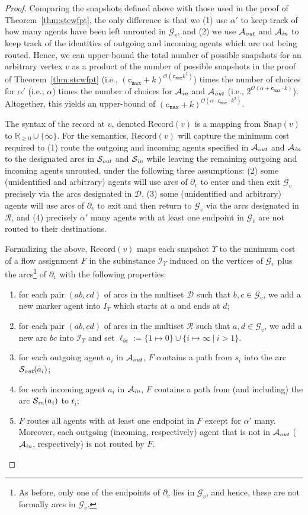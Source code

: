 \documentclass[letterpaper]{article} %
\newcommand{\bigoh}{\ensuremath{{\mathcal O}}}
\newcommand{\cmax}{\mathtt{c_{max}}}
\newcommand{\forgottenG}{\mathcal{G}}
\newcommand{\Rec}{\text{Record}}
\renewcommand{\R}{\mathcal{R}}
\renewcommand{\D}{\mathcal{D}}
\newcommand{\Sout}{\mathcal{S}_\emph{out}}
\newcommand{\Sin}{\mathcal{S}_\emph{in}}
\newcommand{\Aout}{\mathcal{A}_\emph{out}}
\newcommand{\Ain}{\mathcal{A}_\emph{in}}
\newcommand{\snap}{\text{Snap}}
\begin{document}
\begin{proof}
Comparing the snapshots defined above with those used in the proof of Theorem~\ref{thm:stcwfpt}, the only difference is that we (1) use $\alpha'$ to keep track of how many agents have been left unrouted in $\forgottenG_v$, and (2) we use $\Aout$ and $\Ain$ to keep track of the identities of outgoing and incoming agents which are not being routed. Hence, we can upper-bound the total number of possible snapshots for an arbitrary vertex $v$ as a product of the number of possible snapshots in the proof of Theorem~\ref{thm:stcwfpt} (i.e., $(\cmax+k)^{\bigoh(\cmax k^2)}$) times the number of choices for $\alpha'$ (i.e., $\alpha$) times the number of choices for $\Ain$ and $\Aout$ (i.e., $2^{\bigoh(\alpha+\cmax\cdot k)}$). Altogether, this yields an upper-bound of $(\cmax+k)^{\bigoh(\alpha \cdot \cmax \cdot k^2)}$.

The syntax of the record at $v$, denoted $\Rec(v)$ is a mapping from $\snap(v)$ to $\mathbb{R}_{\geq 0}\cup \{\infty\}$. For the semantics, $\Rec(v)$ will capture the minimum cost required to (1) route the outgoing and incoming agents specified in $\Aout$ and $\Ain$ to the designated arcs in $\Sout$ and $\Sin$ while leaving the remaining outgoing and incoming agents unrouted, under the following three assumptions: (2) some (unidentified and arbitrary) agents will use arcs of $\partial_v$ to enter and then exit $\forgottenG_v$ precisely via the arcs designated in $\D$, (3) some (unidentified and arbitrary) agents will use arcs of $\partial_v$ to exit and then return to $\forgottenG_v$ via the arcs designated in $\R$, and (4) precisely $\alpha'$ many agents with at least one endpoint in $\forgottenG_v$ are not routed to their destinations.

Formalizing the above, $\Rec(v)$ maps each snapshot $\Upsilon$ to the minimum cost of a flow assignment $F$ in the subinstance $\mathcal{I}_\Upsilon$ induced on the vertices of $\forgottenG_v$ plus the arcs\footnote{As before, only one of the endpoints of $\partial_v$ lies in $\forgottenG_v$, and hence, these are not formally arcs in $\forgottenG_v$.} of $\partial_v$ with the following properties:
\begin{enumerate}
\item for each pair $(ab,cd)$ of arcs in the multiset $\D$ such that $b,c\in \forgottenG_v$, we add a new marker agent into $I_\Upsilon$ which starts at $a$ and ends at $d$;
\item for each pair $(ab,cd)$ of arcs in the multiset $\R$ such that $a,d\in \forgottenG_v$, we add a new arc $bc$ into $\mathcal{I}_\Upsilon$ and set $\ell_{bc}:=\{1\mapsto 0\}\cup \{i\mapsto \infty~|~i>1\}$.
\item for each outgoing agent $a_i$ in $\Aout$, $F$ contains a path from $s_i$ into the arc $\Sout(a_i)$;
\item for each incoming agent $a_i$ in $\Ain$, $F$ contains a path from (and including) the arc $\Sin(a_i)$ to $t_i$;
\item $F$ routes all agents with at least one endpoint in $F$ except for $\alpha'$ many. Moreover, each outgoing (incoming, respectively) agent that is not in $\Aout$ ($\Ain$, respectively) is not routed by $F$.
\end{enumerate}


\end{proof}
\end{document}
